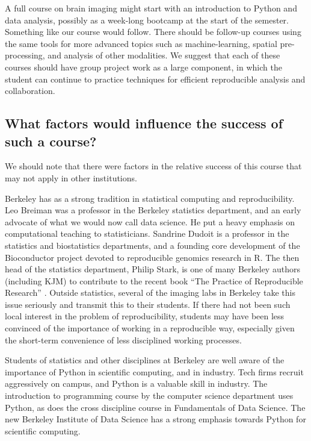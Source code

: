A full course on brain imaging might start with an introduction to Python and
data analysis, possibly as a week-long bootcamp at the start of the semester.
Something like our course would follow.  There should be follow-up courses
using the same tools for more advanced topics such as machine-learning,
spatial pre-processing, and analysis of other modalities. We suggest that each
of these courses should have group project work as a large component, in which
the student can continue to practice techniques for efficient reproducible
analysis and collaboration.

\subsection{What factors would influence the success of such a course?}

We should note that there were factors in the relative success of this
course that may not apply in other institutions.

Berkeley has as a strong tradition in statistical computing and
reproducibility.  Leo Breiman was a professor in the Berkeley statistics
department, and an early advocate of what we would now call data science.  He
put a heavy emphasis on computational teaching to statisticians.  Sandrine
Dudoit is a professor in the statistics and biostatistics departments, and a
founding core development of the Bioconductor project devoted to reproducible
genomics research in R.  The then head of the statistics department, Philip
Stark, is one of many Berkeley authors (including KJM) to contribute to the
recent book ``The Practice of Reproducible Research''
\citep{kitzes2017practice}. Outside statistics, several of the imaging labs in
Berkeley take this issue seriously and transmit this to their students.  If
there had not been such local interest in the problem of reproducibility, 
students may have been less convinced of the importance of
working in a reproducible way, especially given the short-term convenience
of less disciplined working processes.


Students of statistics and other disciplines at Berkeley are well aware of the
importance of Python in scientific computing, and in industry.  Tech firms
recruit aggressively on campus, and Python is a valuable skill in industry.
The introduction to programming course by the computer science department uses
Python, as does the cross discipline course in Fundamentals of Data Science.
The new Berkeley Institute of Data Science has a strong emphasis towards
Python for scientific computing.

